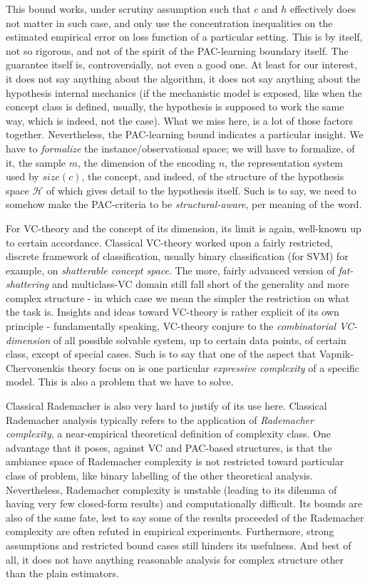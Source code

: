 \documentclass[10pt]{article} %
\begin{document}
This bound works, under scrutiny assumption such that $c$ and $h$ effectively does not matter in such case, and only use the concentration inequalities on the estimated empirical error on loss function of a particular setting. This is by itself, not so rigorous, and not of the spirit of the PAC-learning boundary itself. The guarantee itself is, controversially, not even a good one. At least for our interest, it does not say anything about the algorithm, it does not say anything about the hypothesis internal mechanics (if the mechanistic model is exposed, like when the concept class is defined, usually, the hypothesis is supposed to work the same way, which is indeed, not the case). What we miss here, is a lot of those factors together. Nevertheless, the PAC-learning bound indicates a particular insight. We have to \textit{formalize} the instance/observational space; we will have to formalize, of it, the sample $m$, the dimension of the encoding $n$, the representation system used by $size(c)$, the concept, and indeed, of the structure of the hypothesis space $\mathcal{H}$ of which gives detail to the hypothesis itself. Such is to say, we need to somehow make the PAC-criteria to be \textit{structural-aware}, per meaning of the word. 

For VC-theory and the concept of its dimension, its limit is again, well-known up to certain accordance. Classical VC-theory worked upon a fairly restricted, discrete framework of classification, usually binary classification (for SVM) for example, on \textit{shatterable concept space}. The more, fairly advanced version of \textit{fat-shattering} and multiclass-VC domain still fall short of the generality and more complex structure - in which case we mean the simpler the restriction on what the task is. Insights and ideas toward VC-theory is rather explicit of its own principle - fundamentally speaking, VC-theory conjure to the \textit{combinatorial VC-dimension} of all possible solvable system, up to certain data points, of certain class, except of special cases. Such is to say that one of the aspect that Vapnik-Chervonenkis theory focus on is one particular \textit{expressive complexity} of a specific model. This is also a problem that we have to solve. 

Classical Rademacher is also very hard to justify of its use here. Classical Rademacher analysis typically refers to the application of \textit{Rademacher complexity}, a near-empirical theoretical definition of complexity class. One advantage that it poses, against VC and PAC-based structures, is that the ambiance space of Rademacher complexity is not restricted toward particular class of problem, like binary labelling of the other theoretical analysis. Nevertheless, Rademacher complexity is unstable (leading to its dilemma of having very few closed-form results) and computationally difficult. Its bounds are also of the same fate, lest to say some of the results proceeded of the Rademacher complexity are often refuted in empirical experiments. Furthermore, strong assumptions and restricted bound cases still hinders its usefulness. And best of all, it does not have anything reasonable analysis for complex structure other than the plain estimators. 
\end{document}
